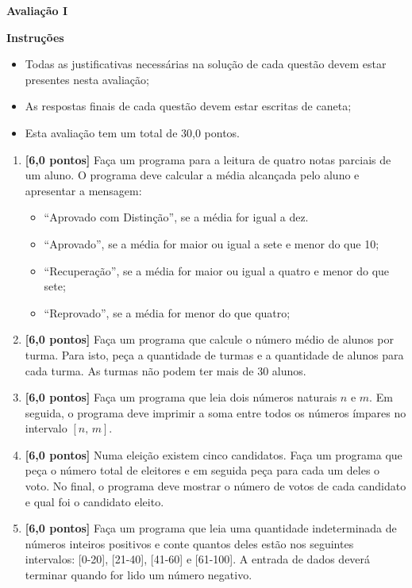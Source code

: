 \documentclass[12pt,a4paper]{article}
\begin{document}
\begin{center}
 \textbf{Avaliação I}
\end{center}

\textbf{Instruções}
\begin{itemize}
 \item Todas as justificativas necessárias na solução de cada questão devem 
 estar presentes nesta avaliação;
 \item As respostas finais de cada questão devem estar escritas de caneta;
 \item Esta avaliação tem um total de 30,0 pontos.
\end{itemize}

\begin{enumerate}
  \item \textbf{[6,0 pontos]} Faça um programa para a leitura de quatro notas parciais de um aluno.
  O programa deve calcular a média alcançada pelo aluno e apresentar a mensagem:
    \begin{itemize}
      \item ``Aprovado com Distinção'', se a média for igual a dez.
      \item ``Aprovado'', se a média for maior ou igual a sete e menor do que 10;
      \item ``Recuperação'', se a média for maior ou igual a quatro e menor do que sete;
      \item ``Reprovado'', se a média for menor do que quatro;
    \end{itemize}
  
  \item \textbf{[6,0 pontos]} Faça um programa que calcule o número médio de alunos por turma.
  Para isto, peça a quantidade de turmas e a quantidade de alunos para cada turma. 
  As turmas não podem ter mais de 30 alunos.
  
  \item \textbf{[6,0 pontos]} Faça um programa que leia dois números naturais $n$ e $m$.
  Em seguida, o programa deve imprimir a soma entre todos os números ímpares no intervalo
  $[n,\, m]$.

  \item \textbf{[6,0 pontos]} Numa eleição existem cinco candidatos. Faça um 
  programa que peça o número total de eleitores e em seguida peça para cada um deles
  o voto. No final, o programa deve mostrar o número de votos de cada candidato e
  qual foi o candidato eleito.

  \item \textbf{[6,0 pontos]} Faça um programa que leia uma quantidade indeterminada 
  de números inteiros positivos e conte quantos deles estão nos seguintes intervalos:
  [0-20], [21-40], [41-60] e [61-100]. A entrada de dados deverá terminar 
  quando for lido um número negativo.

\end{enumerate}
\end{document}
